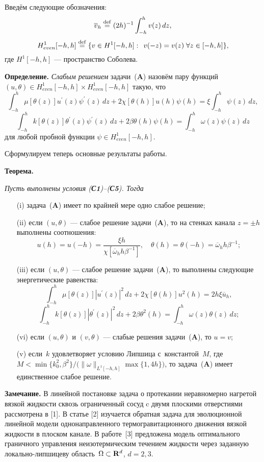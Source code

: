 Введём следующие обозначения:
$$
\overline{v}_h\stackrel{{\rm def}}{=}(2h)^{-1}\int_{-h}^hv(z)\,dz,
$$
$$
H^1_{ even}[-h,h]\stackrel{{\rm def}}{=}\{v\in H^1[-h,h]:\;\, v(-z)=v(z)\; \forall z\in [-h,h]\},
$$
где  $H^1[-h,h]$ --- пространство Соболева.

\medskip
{\bf  Определение.} {\it  Слабым решением} задачи~({\bf A}) назовём пару функций ${(u, \theta)\in H^1_{even}[-h,h]\times H^1_{even}[-h,h]}$ такую, что
$$
\int_{-h}^h\mu[\theta(z)]u^\prime(z) \psi^\prime(z)\,dz
+2\chi[\theta(h)]u(h)\psi(h)
=\xi\int_{-h}^h \psi(z)\,dz,
$$
$$
\int_{-h}^hk[\theta(z)]\theta^\prime(z) \psi^\prime(z)\,dz
+2\beta\theta(h)\psi(h)
=\int_{-h}^h \omega(z)\psi(z)\,dz
$$
для любой пробной функции ${\psi\in H^1_{even}[-h,h]}$.
\medskip

Сформулируем теперь основные результаты работы.

\medskip
\textbf{Теорема.}
{\it
Пусть выполнены условия {\rm({\bf С1})}--{\rm({\bf С5})}. Тогда
\begin{itemize}
\item[{\rm (i)}] задача~{\rm({\bf A})} имеет по крайней мере одно слабое решение;
\item[{\rm (ii)}] если ${(u,\theta)}$ --- слабое решение задачи~{\rm({\bf A})}, то на стенках канала ${z=\pm h}$ выполнены соотношения:
$$
u(h)=u(-h)=\frac{\xi h}{\chi[\overline{\omega}_h h\beta^{-1}]},\quad \theta(h)=\theta(-h)=\overline{\omega}_h h\beta^{-1};
$$
\item[{\rm (iii)}]
если ${(u,\theta)}$ --- слабое решение задачи~{\rm({\bf A})}, то  выполнены следующие энергетические равенства:
$$
\int_{-h}^h\mu[\theta(z)]|u^\prime(z)|^2\,dz
+2\chi[\theta(h)]u^2(h)
=2h\xi\overline{u}_h,
$$
$$
\int_{-h}^hk[\theta(z)]|\theta^\prime(z)|^2\,dz
+2\beta\theta^2(h)
=\int_{-h}^h\omega(z) \theta(z)\,dz;
$$
\item[{\rm (vi)}] если $(u,\theta)$ и $(v,\theta)$ --- слабые решения задачи~{\rm({\bf A})}, то ${u=v}$;
\item[{\rm (v)}] если~$k$ удовлетворяет условию Липшица
с~константой~$M$, где ${M<{\min\{k_0^2,\beta^2\}}/\big({\|\omega\|_{L^1[-h,h]}\max\{1,4h\}}\big)}$,
то задача~{\rm({\bf A})} имеет единственное слабое решение.
\end{itemize}
}

{\bf Замечание.} В линейной постановке задача о протекании неравномерно нагретой вязкой жидкости сквозь ограниченный сосуд c двумя плоскими отверстиями рассмотрена в [1]. В статье [2] изучается обратная задача для эволюционной линейной модели одно\-направленного термогравитационного движения вязкой жидкости в плоском канале. В работе~[3] предложена модель оптимального граничного управления неизотермическим течением жидкости через заданную локально-липшицеву область~${\Omega\subset{\bf R}^d}$, ${d=2,3}$.

